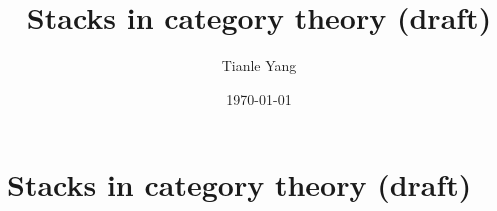 \documentclass{noteformyself}
\title{Stacks in category theory (draft)}
\author{Tianle Yang}
\date{\today}
\begin{document}
    \maketitle

    \section{Stacks in category theory (draft)}



\end{document}
